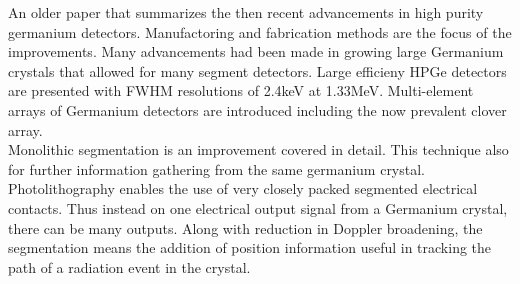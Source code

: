 \documentclass[12pt]{article}
\begin{document}
{\large\textbf{\cite{Sangsingkeow2003183}}}

An older paper that summarizes the then recent advancements in high purity germanium detectors. Manufactoring and fabrication methods are the focus of the improvements. Many advancements had been made in growing large Germanium crystals that allowed for many segment detectors. Large efficieny HPGe detectors are presented with FWHM resolutions of 2.4keV at 1.33MeV. Multi-element arrays of Germanium detectors are introduced including the now prevalent clover array.
\\
Monolithic segmentation is an improvement covered in detail. This technique also for further information gathering from the same germanium crystal. Photolithography enables the use of very closely packed segmented electrical contacts. Thus instead on one electrical output signal from a Germanium crystal, there can be many outputs. Along with reduction in Doppler broadening, the segmentation means the addition of position information useful in tracking the path of a radiation event in the crystal.
\\[20pt]




\end{document}
